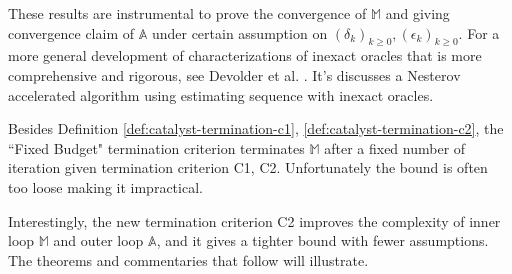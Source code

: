 \documentclass[12pt]{article}
\begin{document}
            These results are instrumental to prove the convergence of $\mathbb M$ and giving convergence claim of $\mathbb A$ under certain assumption on $(\delta_k)_{k \ge 0}, (\epsilon_k)_{k \ge0}$. 
            For a more general development of characterizations of inexact oracles that is more comprehensive and rigorous, see Devolder et al. \cite{devolder_first-order_2014}. 
            It's discusses a Nesterov accelerated algorithm using estimating sequence with inexact oracles. 
            \par
            Besides Definition \ref{def:catalyst-termination-c1}, \ref{def:catalyst-termination-c2}, the ``Fixed Budget" termination criterion terminates $\mathbb M$ after a fixed number of iteration given termination criterion C1, C2. 
            Unfortunately the bound is often too loose making it impractical. 
            \par
            Interestingly, the new termination criterion C2 improves the complexity of inner loop $\mathbb M$ and outer loop $\mathbb A$, and it gives a tighter bound with fewer assumptions. 
            The theorems and commentaries that follow will illustrate. 
\end{document}
